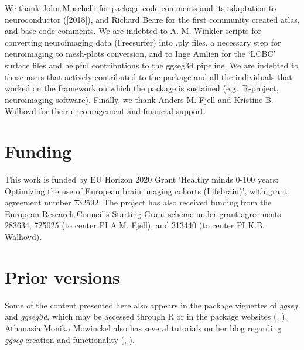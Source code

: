 \documentclass[fleqn,10pt]{wlpeerj} %
\begin{document}
We thank John Muschelli for package code comments and its adaptation to neuroconductor ({[}2018{]}), and Richard Beare for the first community created atlas, and base code comments.
We are indebted to A. M. Winkler scripts for converting neuroimaging data (Freesurfer) into .ply files, a necessary step for neuroimaging to mesh-plots conversion, and to Inge Amlien for the `LCBC' surface files and helpful contributions to the ggseg3d pipeline.
We are indebted to those users that actively contributed to the package and all the individuals that worked on the framework on which the package is sustained (e.g.~R-project, neuroimaging software).
Finally, we thank Anders M. Fjell and Kristine B. Walhovd for their encouragement and financial support.

\hypertarget{funding}{%
\section{Funding}\label{funding}}

This work is funded by EU Horizon 2020 Grant `Healthy minds 0-100 years: Optimizing the use of European brain imaging cohorts (Lifebrain)', with grant agreement number 732592.
The project has also received funding from the European Research Council's Starting Grant scheme under grant agreements 283634, 725025 (to center PI A.M. Fjell), and 313440 (to center PI K.B. Walhovd).

\hypertarget{prior-versions}{%
\section{Prior versions}\label{prior-versions}}

Some of the content presented here also appears in the package vignettes of \emph{ggseg} and \emph{ggseg3d}, which may be accessed through R or in the package websites (\citet{ggseg}, \citet{ggseg3d}).
Athanasia Monika Mowinckel also has several tutorials on her blog regarding \emph{ggseg} creation and functionality (\citet{ggsegAnim}, \citet{ggsegIntro}).

\renewcommand\refname{References}

\end{document}
